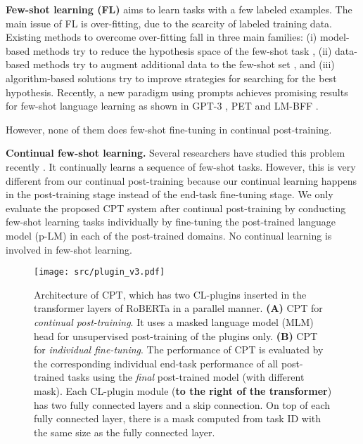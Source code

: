 \documentclass[11pt]{article}
\begin{document}
\textbf{Few-shot learning (FL)} aims to learn tasks with a few labeled examples. The main issue of FL is over-fitting, due to the scarcity of
labeled training data. Existing methods to overcome over-fitting fall in three main families: (i) model-based methods try to reduce the hypothesis space of the few-shot task \cite{DBLP:conf/nips/TriantafillouZU17,DBLP:conf/coling/HuLT0S18}, (ii) data-based methods try to augment additional data to the few-shot set \cite{DBLP:conf/nips/BenaimW18,DBLP:conf/aaai/GaoHX0LLS20}, and (iii) algorithm-based solutions try to improve strategies for searching for the best hypothesis. Recently, a new
paradigm using prompts achieves promising results for few-shot language learning as shown
in GPT-3 \cite{brown2020language}, PET \cite{DBLP:conf/eacl/SchickS21} and LM-BFF \cite{DBLP:conf/acl/GaoFC20}. {\color{black}However, none of them does few-shot fine-tuning in continual post-training. 

\textbf{Continual few-shot learning.} Several researchers have studied this problem recently \cite{DBLP:journals/corr/abs-2004-11967,DBLP:journals/corr/abs-2110-07298,DBLP:conf/emnlp/JinLR021,DBLP:conf/naacl/XiaYFY21,DBLP:conf/acl/0001LX22}. It continually learns a sequence of few-shot tasks. However, this is very different from our continual post-training because our continual learning happens in the post-training stage instead of the end-task fine-tuning stage. We only evaluate the proposed CPT system after continual post-training by conducting few-shot learning tasks individually by fine-tuning the post-trained language model (p-LM) in each of the post-trained domains. No continual learning is involved in few-shot learning.}



\begin{figure*}[h]
\centering
\texttt{[image: src/plugin\_v3.pdf]}
\caption{
Architecture of CPT, which has two CL-plugins inserted in the transformer layers of RoBERTa in a parallel manner. \textbf{(A)} CPT for \textit{continual post-training}. It uses a masked language model (MLM) head for unsupervised post-training of the plugins only. \textbf{(B)} CPT for \textit{individual fine-tuning}. The performance of CPT is evaluated by the corresponding individual end-task performance of all post-trained tasks using the \textit{final} post-trained model (with different mask). Each CL-plugin module (\textbf{to the right of the transformer}) has two fully connected layers and a skip connection. On top of each fully connected layer, there is a mask computed from task ID  with the same size as the fully connected layer.}
\label{plugin}
\end{figure*}
\end{document}
